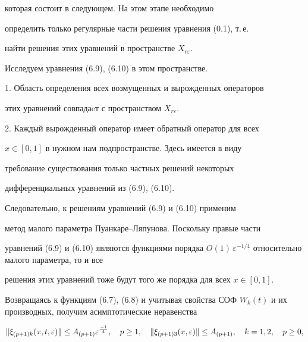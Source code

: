 которая состоит в следующем. На этом этапе необходимо


определить только регулярные части решения уравнения (0.1), т.\,е.


найти решения этих уравнений в пространстве $ X_{r \varepsilon}$.


Исследуем уравнения (6.9), (6.10) в этом пространстве.





1. Область определения всех возмущенных и вырожденных операторов


этих уравнений совпадаeт с пространством $ X_{r \varepsilon}$.





2. Каждый вырожденный оператор имеет обратный оператор для всех


$x \in [0,1]$ в нужном нам подпространстве. Здесь имеется в виду


требование существования только частных решений некоторых


дифференциальных уравнений из (6.9), (6.10).





Следовательно, к решениям уравнений (6.9) и (6.10) применим


метод малого параметра Пуанкаре--Ляпунова. Поскольку правые части


уравнений (6.9) и (6.10) являются функциями порядка $ O(1) \,


\varepsilon^{-1/4}$ относительно малого параметра, то и все


решения этих уравнений тоже будут того же порядка для всех $ x \in


[0,1]$.





Возвращаясь к функциям (6.7), (6.8) и учитывая свойства СОФ $W_k


(t)$ и их производных, получим асимптотические неравенства


\begin{equation}


\| \xi_{(p+1)k} (x, t, \e) \| \leq A_{(p+1)}


\e^{\frac{-1}{4}}, \quad p\geq 1,\quad


\| \xi_{(p+1)3} (x, \e) \|


\leq A_{(p+1)},\quad k=1,2,\quad p \geq 0, 


\end{equation}


